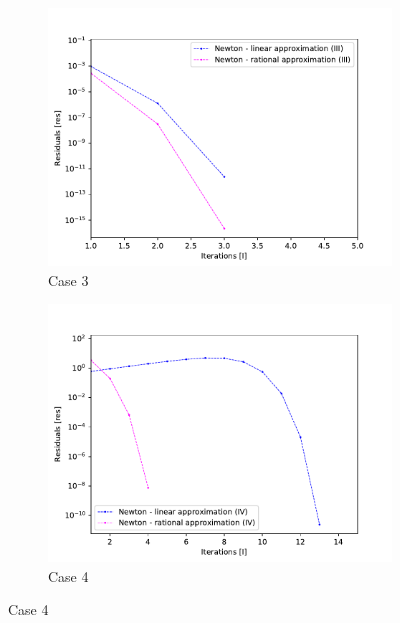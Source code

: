 \documentclass[11pt, oneside]{article}
\begin{document}
\begin{figure}
		\begin{subfigure}[b]{.45\linewidth}
			\includegraphics[width=\linewidth]{figure/3.pdf}
			\caption{Case 3}
		\end{subfigure}
		\begin{subfigure}[b]{.45\linewidth}
			\includegraphics[width=\linewidth]{figure/4.pdf}
			\caption{Case 4}
		\end{subfigure}
		

\end{figure}
\end{document}

